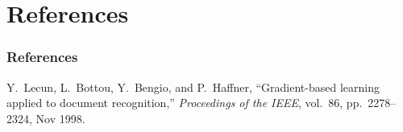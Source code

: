 \section{References}
\begin{frame}
\frametitle{References}
\footnotesize{
	\begin{thebibliography}{99}
		Y.~{Lecun}, L.~{Bottou}, Y.~{Bengio}, and P.~{Haffner}, ``Gradient-based
		learning applied to document recognition,'' {\em Proceedings of the IEEE},
		vol.~86, pp.~2278--2324, Nov 1998.
	\end{thebibliography}
}
\end{frame}

